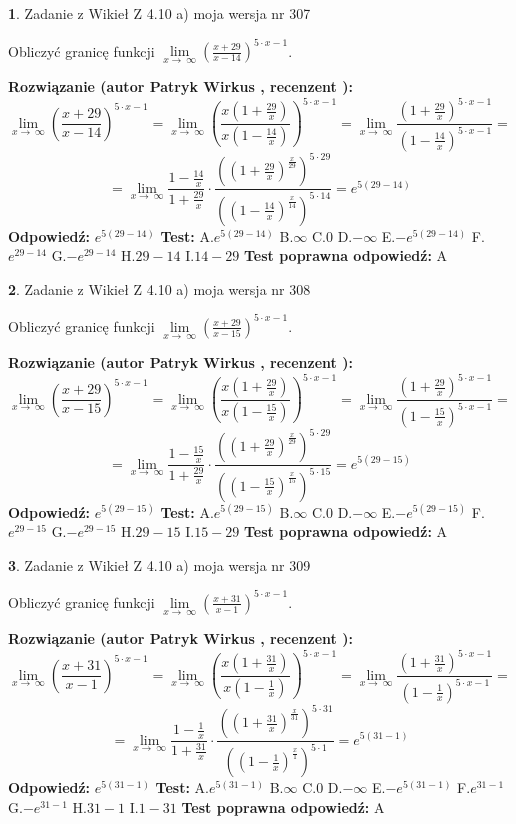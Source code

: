 \documentclass[12pt, a4paper]{article}
\theoremstyle{definition} %
\newtheorem{zad}{}
\newcommand{\zadStart}[1]{\begin{zad}#1\newline}
\newcommand{\zadStop}{\end{zad}}
\newcommand{\rozwStart}[2]{\noindent \textbf{Rozwiązanie (autor #1 , recenzent #2): }\newline}
\newcommand{\rozwStop}{\newline}
\newcommand{\odpStart}{\noindent \textbf{Odpowiedź:}\newline}
\newcommand{\odpStop}{\newline}
\newcommand{\testStart}{\noindent \textbf{Test:}\newline}
\newcommand{\testStop}{\newline}
\newcommand{\kluczStart}{\noindent \textbf{Test poprawna odpowiedź:}\newline}
\newcommand{\kluczStop}{\newline}
\begin{document}
\zadStart{Zadanie z Wikieł Z 4.10 a) moja wersja nr 307}


Obliczyć granicę funkcji  $\lim\limits_{x\to\ \infty}(\frac{x+29}{x-14})^{5\cdot x-1}$.
\zadStop
\rozwStart{Patryk Wirkus}{}
$$\lim\limits_{x\to\ \infty}(\frac{x+29}{x-14})^{5\cdot x-1} = \lim\limits_{x\to\ \infty}(\frac{x(1+\frac{29}{x})}{x(1-\frac{14}{x})})^{5\cdot x-1}=\lim\limits_{x\to\ \infty}\frac{(1+\frac{29}{x})^{5\cdot x-1}}{(1-\frac{14}{x})^{5\cdot x-1}}=$$
$$=\lim\limits_{x\to\ \infty}\frac{1-\frac{14}{x}}{1+\frac{29}{x}}\cdot\frac{((1+\frac{29}{x})^{\frac{x}{29}})^{5\cdot29}}{((1-\frac{14}{x})^{\frac{x}{14}})^{5\cdot14}}=e^{5(29-14)}$$
\rozwStop
\odpStart
$e^{5(29-14)}$
\odpStop
\testStart
A.$e^{5(29-14)}$ B.$\infty$ C.$0$ D.$-\infty$ E.$-e^{5(29-14)}$
F.$e^{29-14}$ G.$-e^{29-14}$
H.$29-14$
I.$14-29$
\testStop
\kluczStart
A
\kluczStop



\zadStart{Zadanie z Wikieł Z 4.10 a) moja wersja nr 308}


Obliczyć granicę funkcji  $\lim\limits_{x\to\ \infty}(\frac{x+29}{x-15})^{5\cdot x-1}$.
\zadStop
\rozwStart{Patryk Wirkus}{}
$$\lim\limits_{x\to\ \infty}(\frac{x+29}{x-15})^{5\cdot x-1} = \lim\limits_{x\to\ \infty}(\frac{x(1+\frac{29}{x})}{x(1-\frac{15}{x})})^{5\cdot x-1}=\lim\limits_{x\to\ \infty}\frac{(1+\frac{29}{x})^{5\cdot x-1}}{(1-\frac{15}{x})^{5\cdot x-1}}=$$
$$=\lim\limits_{x\to\ \infty}\frac{1-\frac{15}{x}}{1+\frac{29}{x}}\cdot\frac{((1+\frac{29}{x})^{\frac{x}{29}})^{5\cdot29}}{((1-\frac{15}{x})^{\frac{x}{15}})^{5\cdot15}}=e^{5(29-15)}$$
\rozwStop
\odpStart
$e^{5(29-15)}$
\odpStop
\testStart
A.$e^{5(29-15)}$ B.$\infty$ C.$0$ D.$-\infty$ E.$-e^{5(29-15)}$
F.$e^{29-15}$ G.$-e^{29-15}$
H.$29-15$
I.$15-29$
\testStop
\kluczStart
A
\kluczStop



\zadStart{Zadanie z Wikieł Z 4.10 a) moja wersja nr 309}


Obliczyć granicę funkcji  $\lim\limits_{x\to\ \infty}(\frac{x+31}{x-1})^{5\cdot x-1}$.
\zadStop
\rozwStart{Patryk Wirkus}{}
$$\lim\limits_{x\to\ \infty}(\frac{x+31}{x-1})^{5\cdot x-1} = \lim\limits_{x\to\ \infty}(\frac{x(1+\frac{31}{x})}{x(1-\frac{1}{x})})^{5\cdot x-1}=\lim\limits_{x\to\ \infty}\frac{(1+\frac{31}{x})^{5\cdot x-1}}{(1-\frac{1}{x})^{5\cdot x-1}}=$$
$$=\lim\limits_{x\to\ \infty}\frac{1-\frac{1}{x}}{1+\frac{31}{x}}\cdot\frac{((1+\frac{31}{x})^{\frac{x}{31}})^{5\cdot31}}{((1-\frac{1}{x})^{\frac{x}{1}})^{5\cdot1}}=e^{5(31-1)}$$
\rozwStop
\odpStart
$e^{5(31-1)}$
\odpStop
\testStart
A.$e^{5(31-1)}$ B.$\infty$ C.$0$ D.$-\infty$ E.$-e^{5(31-1)}$
F.$e^{31-1}$ G.$-e^{31-1}$
H.$31-1$
I.$1-31$
\testStop
\kluczStart
A
\kluczStop
\end{document}
